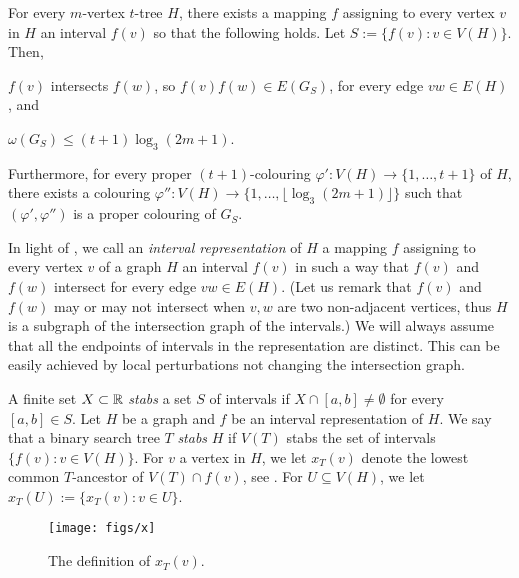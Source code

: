 \documentclass[kpfonts]{patmorin}
\let\leq\leqslant
\begin{document}
\begin{lem}
  For every $m$-vertex $t$-tree $H$, there exists a mapping $f$ assigning to every vertex $v$ in $H$ an interval $f(v)$ so that the following holds. Let $S:=\{f(v):v\in V(H)\}$. Then,
\begin{compactenum}
  \item $f(v)$ intersects $f(w)$, so $f(v)f(w)\in E(G_S)$, for every edge $vw\in E(H)$, and 
  \item $\omega(G_S) \leq (t+1)\log_3(2m+1)$.
\end{compactenum}
Furthermore, 
for every proper $(t+1)$-colouring $\varphi':V(H)\to\{1,\ldots,t+1\}$ of $H$, there exists a colouring $\varphi'':V(H)\to\{1,\ldots,\lfloor\log_3(2m+1)\rfloor\}$ such that $(\varphi',\varphi'')$ is a proper colouring of $G_S$.
\end{lem}

In light of , we call an \emph{interval representation} of $H$ 
a mapping $f$ assigning to every vertex $v$ of a graph $H$ an interval $f(v)$ in such a way that $f(v)$ and $f(w)$ intersect for every edge $vw\in E(H)$. 
(Let us remark that $f(v)$ and $f(w)$ may or may not intersect when $v,w$ are two non-adjacent vertices, thus $H$ is a subgraph of the intersection graph of the intervals.) 
We will always assume that all the endpoints of intervals in the representation are distinct. 
This can be easily achieved by local perturbations not changing the intersection graph.

A finite set $X\subset\mathbb{R}$ \emph{stabs} a set $S$ of intervals if $X\cap [a,b]\neq\emptyset$ for every $[a,b]\in S$.
Let $H$ be a graph and $f$ be an interval representation of $H$. 
We say that a binary search tree $T$ \emph{stabs} $H$ if $V(T)$ stabs the set of intervals $\{f(v):v\in V(H)\}$. 
For $v$ a vertex in $H$, we let $x_T(v)$ denote the lowest common $T$-ancestor of $V(T)\cap f(v)$, see .
For $U \subseteq V(H)$, we let $x_T(U):=\{x_T(v):v\in U\}$.

\begin{figure}
  \begin{center}
    \texttt{[image: figs/x]}
  \end{center}
  \caption{The definition of $x_T(v)$.}
\end{figure}
\end{document}

